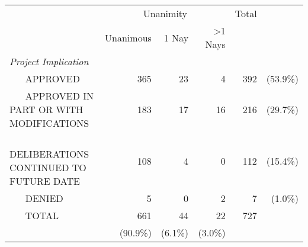 \begin{tabular}{|lrrrrr|} \toprule
 & \multicolumn{3}{c}{Unanimity} & Total & \\ 
 & Unanimous & 1 Nay & >1 Nays & & \\ \midrule
\textit{Project Implication} & & & & & \\ 
~ ~ APPROVED & 365 & 23 & 4 & 392 & (53.9\%) \\ [1ex] 
~ ~ APPROVED IN PART OR WITH MODIFICATIONS & 183 & 17 & 16 & 216 & (29.7\%) \\ [1ex] 
~ ~ DELIBERATIONS CONTINUED TO FUTURE DATE & 108 & 4 & 0 & 112 & (15.4\%) \\ [1ex] 
~ ~ DENIED & 5 & 0 & 2 & 7 & (1.0\%) \\ [1ex] 
~ ~ TOTAL & 661 & 44 & 22 & 727 &  \\ [1ex] 
 & (90.9\%) & (6.1\%) & (3.0\%) &  &  \\ [1ex] 
\end{tabular}
